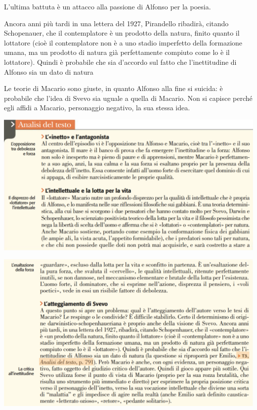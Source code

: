 \documentclass[a4paper, twoside, titlepage]{book}
\begin{document}
L'ultima battuta è un attacco alla passione di Alfonso per la poesia.

Ancora anni più tardi in una lettera del 1927, Pirandello ribadirà, citando Schopenauer, che il contemplatore è un prodotto della natura, finito quanto il lottatore (cioè il contemplatore non è a uno stadio imperfetto della formazione umana, ma un prodotto di natura già perfettamente compiuto come lo è il lottatore). Quindi è probabile che sia d'accordo sul fatto che l'inettitudine di Alfonso sia un dato di natura

Le teorie di Macario sono giuste, in quanto Alfonso alla fine si suicida: è probabile che l'idea di Svevo sia uguale a quella di Macario.
Non si capisce perché egli affidi a Macario, personaggio negativo, la sua stessa idea.

\begin{center}
\includegraphics[width=\textwidth]{ali1}
\end{center}
\vfill
\begin{center}
\includegraphics[width=\textwidth]{ali2}
\end{center}
\end{document}
